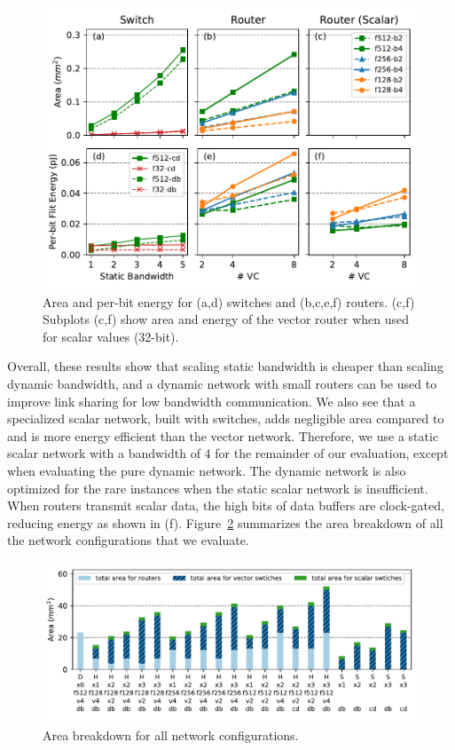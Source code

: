 \begin{figure}
\centering
\includegraphics[width=1\columnwidth]{network/figs/char.pdf}
  \caption{Area and per-bit energy for (a,d) switches and (b,c,e,f) routers. 
  (c,f) Subplots (c,f) show area and energy of the vector router when used for scalar values (32-bit).}\label{fig:char}
\end{figure}

Overall, these results show that scaling static bandwidth is cheaper than scaling dynamic bandwidth, and a dynamic network with small routers can be used to improve link sharing for low bandwidth communication.  
We also see that a specialized scalar network, built with switches, adds negligible area compared to and is more energy efficient than the vector network. 
Therefore, we use a static scalar network with a bandwidth of 4 for the remainder of our evaluation, except when evaluating the pure dynamic network.
The dynamic network is also optimized for the rare instances when the static scalar network is insufficient. 
When routers transmit scalar data, the high bits of data buffers are clock-gated, reducing energy as shown in (f).
Figure~\ref{fig:area} summarizes the area breakdown of all the network configurations that we evaluate.

\begin{figure}
\centering
\includegraphics[width=1\columnwidth]{network/figs/area.pdf}
  \caption{Area breakdown for all network configurations.}\label{fig:area}
\end{figure}

